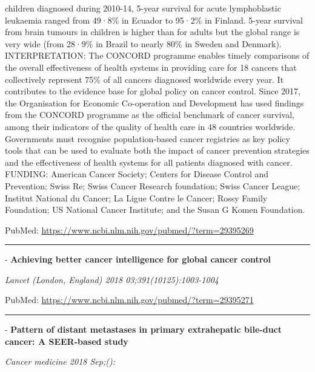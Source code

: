 \documentclass[]{article}
\begin{document}
children diagnosed during 2010-14, 5-year survival for acute
lymphoblastic leukaemia ranged from 49·8\% in Ecuador to 95·2\% in
Finland. 5-year survival from brain tumours in children is higher than
for adults but the global range is very wide (from 28·9\% in Brazil to
nearly 80\% in Sweden and Denmark). INTERPRETATION: The CONCORD
programme enables timely comparisons of the overall effectiveness of
health systems in providing care for 18 cancers that collectively
represent 75\% of all cancers diagnosed worldwide every year. It
contributes to the evidence base for global policy on cancer control.
Since 2017, the Organisation for Economic Co-operation and Development
has used findings from the CONCORD programme as the official benchmark
of cancer survival, among their indicators of the quality of health care
in 48 countries worldwide. Governments must recognise population-based
cancer registries as key policy tools that can be used to evaluate both
the impact of cancer prevention strategies and the effectiveness of
health systems for all patients diagnosed with cancer. FUNDING: American
Cancer Society; Centers for Disease Control and Prevention; Swiss Re;
Swiss Cancer Research foundation; Swiss Cancer League; Institut National
du Cancer; La Ligue Contre le Cancer; Rossy Family Foundation; US
National Cancer Institute; and the Susan G Komen Foundation.

PubMed: \url{https://www.ncbi.nlm.nih.gov/pubmed/?term=29395269}

{}

{}

\begin{center}\rule{0.5\linewidth}{\linethickness}\end{center}

 - \textbf{Achieving better cancer intelligence for global cancer
control}

\emph{Lancet (London, England) 2018 03;391(10125):1003-1004}

PubMed: \url{https://www.ncbi.nlm.nih.gov/pubmed/?term=29395271}

{}

{}

\begin{center}\rule{0.5\linewidth}{\linethickness}\end{center}

 - \textbf{Pattern of distant metastases in primary extrahepatic
bile-duct cancer: A SEER-based study}

\emph{Cancer medicine 2018 Sep;():}
\end{document}
